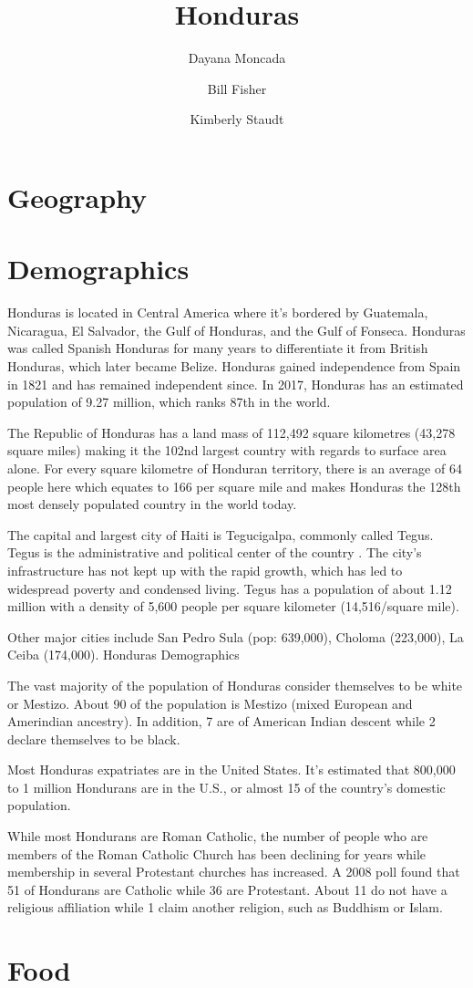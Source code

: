 \documentclass{book}\usepackage[]{graphicx}\usepackage[]{color}
\begin{document}
\title{Honduras}
\author{Dayana Moncada \and Bill Fisher \and Kimberly Staudt}
\date{}
\maketitle

\tableofcontents


\chapter{Geography}


\chapter{Demographics}

Honduras is located in Central America where it's bordered by Guatemala, Nicaragua, El Salvador, the Gulf of Honduras, and the Gulf of Fonseca. Honduras was called Spanish Honduras for many years to differentiate it from British Honduras, which later became Belize. Honduras gained independence from Spain in 1821 and has remained independent since. In 2017, Honduras has an estimated population of 9.27 million, which ranks 87th in the world.

The Republic of Honduras has a land mass of 112,492 square kilometres (43,278 square miles) making it the 102nd largest country with regards to surface area alone. For every square kilometre of Honduran territory, there is an average of 64 people here which equates to 166 per square mile and makes Honduras the 128th most densely populated country in the world today.

The capital and largest city of Haiti is Tegucigalpa, commonly called Tegus. Tegus is the administrative and political center of the country . The city's infrastructure has not kept up with the rapid growth, which has led to widespread poverty and condensed living. Tegus has a population of about 1.12 million with a density of 5,600 people per square kilometer (14,516/square mile).

Other major cities include San Pedro Sula (pop: 639,000), Choloma (223,000), La Ceiba (174,000).
Honduras Demographics

The vast majority of the population of Honduras consider themselves to be white or Mestizo. About 90 of the population is Mestizo (mixed European and Amerindian ancestry). In addition, 7 are of American Indian descent while 2 declare themselves to be black.

Most Honduras expatriates are in the United States. It's estimated that 800,000 to 1 million Hondurans are in the U.S., or almost 15 of the country's domestic population.

While most Hondurans are Roman Catholic, the number of people who are members of the Roman Catholic Church has been declining for years while membership in several Protestant churches has increased. A 2008 poll found that 51 of Hondurans are Catholic while 36 are Protestant. About 11 do not have a religious affiliation while 1 claim another religion, such as Buddhism or Islam.


\chapter{Food}
\end{document}
